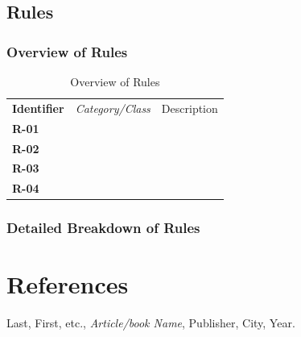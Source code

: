 \documentclass[12pt,letterpaper]{article}
\begin{document}
\subsection{Rules}
\subsubsection{Overview of Rules}

\begin{table}[H]
	\caption{Overview of Rules}
	\begin{tabu} to 
	    \tableheader{}Identifier & Category/Class & Description\\
		R-01 &  & \\
		R-02 &  & \\
		R-03 &  & \\
		R-04 &  & \\
	\end{tabu}
\end{table}

\subsubsection{Detailed Breakdown of Rules}

\renewcommand\refname{\vskip -1cm}
\section{References}

\begin{thebibliography}{16}

Last, First, etc.,
{\it Article/book Name},
Publisher, City, Year.

\end{thebibliography}
\end{document}
